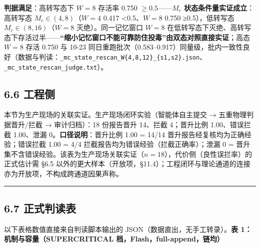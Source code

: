 \documentclass[
]{ctexart}
\begin{document}
\textbf{判据满足}：高转写态下 \(W{=}8\) 存活率 0.750
\(\ge0.5\)------\textbf{\(M_c\) 状态条件量实证成立}：高转写态
\(M_c\in(4,8)\)（\(W{=}4\) 0.417 \textless0.5、\(W{=}8\) 0.750
≥0.5），低转写态 \(M_c\in(8,16)\)（\(W{=}8\) 灭绝）。同一记忆窗口
\(W{=}8\)
在低转写态下灭绝、高转写态下存活过半------\textbf{``缩小记忆窗口不能可靠防住投毒''由双态对照直接实证}；高态
\(W{=}8\) 存活 0.750 与 10-23
同日重跑批次（0.583--0.917）同量级，批内一致性良好（数据与判读：\texttt{\_mc\_state\_rescan\_W\{4,8,12\}\_\{s1,s2\}.json}、\texttt{\_mc\_state\_rescan\_judge.txt}）。

\subsection{6.6 工程侧}\label{ux5de5ux7a0bux4fa7}

本节为生产现场的关联实证。生产现场闭环实验（智能体自主提交 →
五重物理判据晋升/拦截 → 审计归档）：18 份报告晋升 14、拦截 4；晋升比例
1.00、错误拦截 1.00、泄漏 0。\textbf{口径说明}：晋升比例 1.00 = 14/14
晋升报告经复核均为正确经验；错误拦截 1.00 = 4/4
拦截报告均为错误经验（拦截正确率）；泄漏 0 =
晋升集不含错误经验。该表为生产现场关联实证（\(n=18\)），代价侧（良性误拦率）的正式估计需
§6.5
以外的更大样本（开放项，§11.4）；工程闭环与理论通道的连接亦为开放项，不构成跨通道因果声称。

\begin{center}\rule{0.5\linewidth}{0.5pt}\end{center}

\subsection{6.7 正式判读表}\label{ux6b63ux5f0fux5224ux8bfbux8868}

以下表格数值直接来自判读脚本输出的
JSON（数据直出，无手工转录）。\textbf{表 1：机制与容量（SUPERCRITICAL
档，Flash，full-append，链均）}
\end{document}
